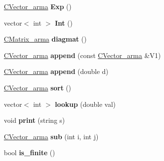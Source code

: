 \begin{DoxyCompactItemize}
\item 
\mbox{\label{class_c_vector__arma_a6396866a2e44a6201adea4536017b030}} 
\hyperlink{class_c_vector__arma}{C\+Vector\+\_\+arma} {\bfseries Exp} ()
\item 
\mbox{\label{class_c_vector__arma_a7f1ec6501b86e6fbdaad5908b87fddbf}} 
vector$<$ int $>$ {\bfseries Int} ()
\item 
\mbox{\label{class_c_vector__arma_afb7fe537fef4a850b981079d9dbfd0da}} 
\hyperlink{class_c_matrix__arma}{C\+Matrix\+\_\+arma} {\bfseries diagmat} ()
\item 
\mbox{\label{class_c_vector__arma_a7801f221a2de673eab7780e8596161a0}} 
\hyperlink{class_c_vector__arma}{C\+Vector\+\_\+arma} {\bfseries append} (const \hyperlink{class_c_vector__arma}{C\+Vector\+\_\+arma} \&V1)
\item 
\mbox{\label{class_c_vector__arma_aa1a2efe08666be6c1295ec86c15d9e28}} 
\hyperlink{class_c_vector__arma}{C\+Vector\+\_\+arma} {\bfseries append} (double d)
\item 
\mbox{\label{class_c_vector__arma_abeee91e29c73496ce6bb9ef84d45b34d}} 
\hyperlink{class_c_vector__arma}{C\+Vector\+\_\+arma} {\bfseries sort} ()
\item 
\mbox{\label{class_c_vector__arma_aff73585336af26dd65ee6c026476dbc5}} 
vector$<$ int $>$ {\bfseries lookup} (double val)
\item 
\mbox{\label{class_c_vector__arma_aa670bffb430618f5114266576a0754b7}} 
void {\bfseries print} (string s)
\item 
\mbox{\label{class_c_vector__arma_ae2cfa4b0fe5efa2d4bbba3d5881ffe5d}} 
\hyperlink{class_c_vector__arma}{C\+Vector\+\_\+arma} {\bfseries sub} (int i, int j)
\item 
\mbox{\label{class_c_vector__arma_a0f732182892406282016b78a2c22aa4b}} 
bool {\bfseries is\+\_\+finite} ()
\end{DoxyCompactItemize}
